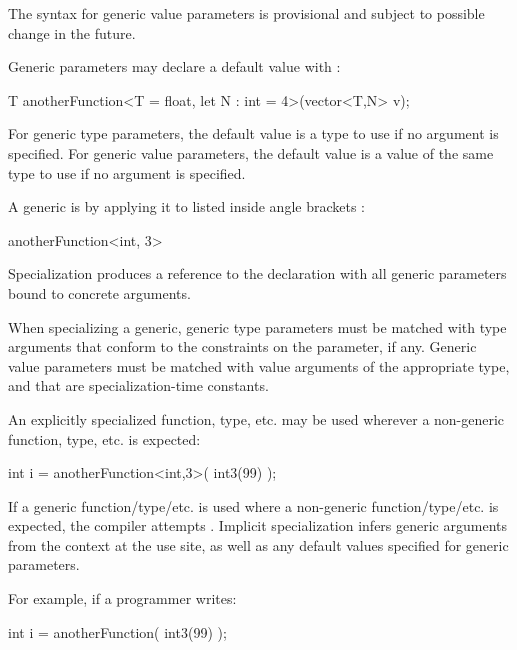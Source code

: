\begin{Note}
The syntax for generic value parameters is provisional and subject to possible change in the future.
\end{Note}

Generic parameters may declare a default value with \Char{=}:

\begin{codeblock}
T anotherFunction<T = float, let N : int = 4>(vector<T,N> v);
\end{codeblock}

For generic type parameters, the default value is a type to use if no argument is specified.
For generic value parameters, the default value is a value of the same type to use if no argument is specified.


A generic is  by applying it to  listed inside angle brackets \Char{<>}:

\begin{codeblock}
anotherFunction<int, 3>
\end{codeblock}

Specialization produces a reference to the declaration with all generic parameters bound to concrete arguments.

When specializing a generic, generic type parameters must be matched with type arguments that conform to the constraints on the parameter, if any.
Generic value parameters must be matched with value arguments of the appropriate type, and that are specialization-time constants.

An explicitly specialized function, type, etc. may be used wherever a non-generic function, type, etc. is expected:

\begin{codeblock}
int i = anotherFunction<int,3>( int3(99) );
\end{codeblock}


If a generic function/type/etc. is used where a non-generic function/type/etc. is expected, the compiler attempts .
Implicit specialization infers generic arguments from the context at the use site, as well as any default values specified for generic parameters.

For example, if a programmer writes:

\begin{codeblock}
int i = anotherFunction( int3(99) );
\end{codeblock}

